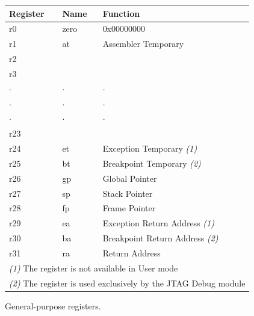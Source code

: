 \documentclass[11pt, twoside, pdftex]{article}
\begin{document}
\begin{figure}[H]
\begin{center}
\begin{tabular}{|l|l|l|} \hline 
\rule{0in}{0.1in}{\bf Register} & {\bf Name} & {\bf Function} \\ \hline
r0 & zero & 0x00000000\\ 
r1 & at & Assembler Temporary\\ 
r2 & &\\ 
r3 & &\\ 
$\cdot$ & $\cdot$ & $\cdot$ \\ 
$\cdot$ & $\cdot$ & $\cdot$ \\ 
$\cdot$ & $\cdot$ & $\cdot$ \\ 
r23 & & \\
r24 & et & Exception Temporary {\it (1)} \\
r25 & bt & Breakpoint Temporary {\it (2)} \\
r26 & gp & Global Pointer \\
r27 & sp & Stack Pointer \\
r28 & fp & Frame Pointer \\
r29 & ea & Exception Return Address {\it (1)} \\ 
r30 & ba & Breakpoint Return Address {\it (2)} \\ 
r31 & ra & Return Address\\ \hline
\multicolumn{3}{|l|}{{\it (1)} The register is not available in User mode} \\
\multicolumn{3}{|l|}{{\it (2)} The register is used exclusively by the JTAG Debug module} \\ \hline
\end{tabular}
\end{center}
	\caption{General-purpose registers.}
	\label{fig:2}
\end{figure}

 
\end{document}
